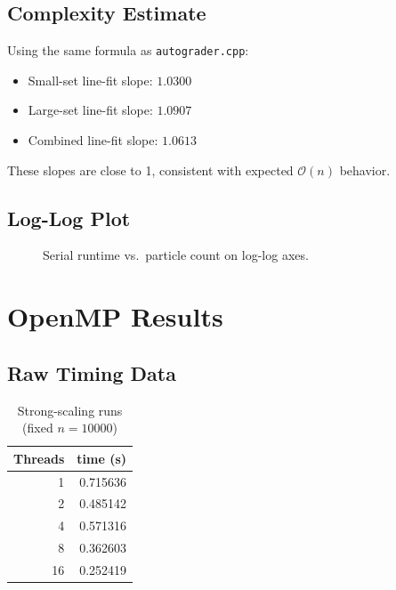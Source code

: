 \documentclass[11pt]{article}
\begin{document}
\subsection{Complexity Estimate}
Using the same formula as \texttt{autograder.cpp}:
\begin{itemize}
  \item Small-set line-fit slope: \(1.0300\)
  \item Large-set line-fit slope: \(1.0907\)
  \item Combined line-fit slope: \(1.0613\)
\end{itemize}
These slopes are close to 1, consistent with expected \(\mathcal{O}(n)\) behavior.

\subsection{Log-Log Plot}
\begin{figure}[h]
\centering
{}
\caption{Serial runtime vs.\ particle count on log-log axes.}
\end{figure}

\section{OpenMP Results}
\subsection{Raw Timing Data}
\begin{table}[h]
\centering
\caption{Strong-scaling runs (fixed \(n=10000\))}
\begin{tabular}{rr}
\toprule
Threads & time (s) \\
\midrule
1 & 0.715636 \\
2 & 0.485142 \\
4 & 0.571316 \\
8 & 0.362603 \\
16 & 0.252419 \\
\bottomrule
\end{tabular}
\end{table}
\end{document}
